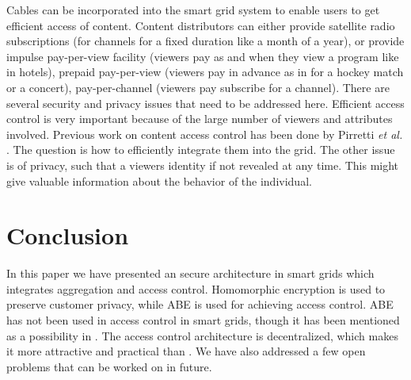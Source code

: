 \documentclass[conference]{IEEEtran}[10pt]
\begin{document}
Cables can be incorporated into the smart grid system to enable users to get efficient access of content. 
Content distributors can either provide satellite radio subscriptions (for channels for a fixed duration like a month of a year), or
provide impulse pay-per-view facility (viewers pay as and when they view a program like in hotels), 
prepaid pay-per-view (viewers pay in advance as in for a hockey match or a concert), 
pay-per-channel (viewers pay subscribe for a channel). 
There are several security and privacy issues that need to be addressed here. 
Efficient access control is very important because of the large number of viewers and attributes involved. 
Previous work on content access control has been done by Pirretti \emph{et al.} \cite{PTMW10}.
The question is how to efficiently integrate them into the grid. 
The other issue is of privacy, such that a viewers identity if not revealed at any time. 
This might give valuable information about the behavior of the individual. 

\section{Conclusion}
\label{sec:conclusion}
In this paper we have presented an secure architecture in smart grids which integrates aggregation and access control. 
Homomorphic encryption is used to preserve customer privacy, while ABE is used for achieving access control. 
ABE has not been used in access control in smart grids, though it has been mentioned as a possibility in \cite{BKAA09}. 
The access control architecture is decentralized, which makes it more attractive and practical than \cite{BKAA09}. 
We have also addressed a few open problems that can be worked on in  future. 
\end{document}
